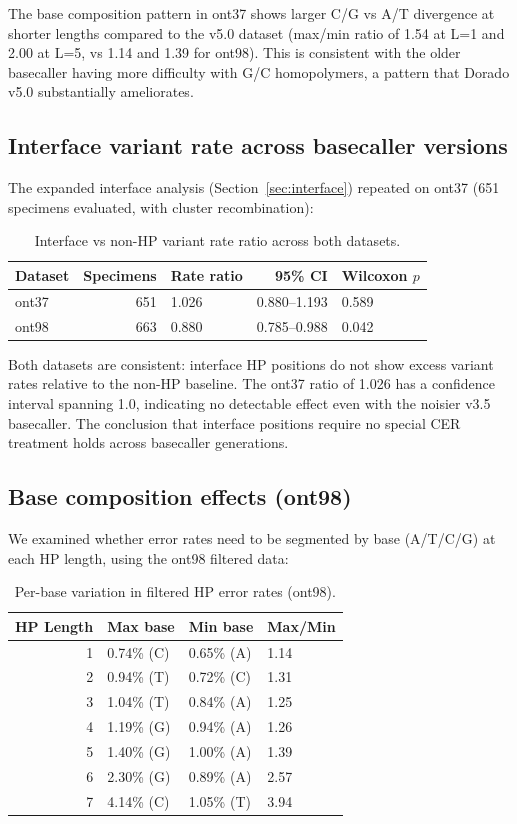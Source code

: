 \documentclass[11pt]{article}
\begin{document}
The base composition pattern in ont37 shows larger C/G vs A/T divergence at
shorter lengths compared to the v5.0 dataset (max/min ratio of 1.54 at L=1
and 2.00 at L=5, vs 1.14 and 1.39 for ont98). This is consistent with the
older basecaller having more difficulty with G/C homopolymers, a pattern that
Dorado v5.0 substantially ameliorates.

\subsection{Interface variant rate across basecaller versions}

The expanded interface analysis (Section~\ref{sec:interface}) repeated on
ont37 (651 specimens evaluated, with cluster recombination):

\begin{table}[h]
\centering
\caption{Interface vs non-HP variant rate ratio across both datasets.}
\label{tab:interface_all}
\begin{tabular}{lrlrl}
\toprule
Dataset & Specimens & Rate ratio & 95\% CI & Wilcoxon $p$ \\
\midrule
ont37 & 651 & 1.026 & 0.880--1.193 & 0.589 \\
ont98 & 663 & 0.880 & 0.785--0.988 & 0.042 \\
\bottomrule
\end{tabular}
\end{table}

Both datasets are consistent: interface HP positions do not show excess
variant rates relative to the non-HP baseline. The ont37 ratio of 1.026 has a
confidence interval spanning 1.0, indicating no detectable effect even with the
noisier v3.5 basecaller. The conclusion that interface positions require no
special CER treatment holds across basecaller generations.

\subsection{Base composition effects (ont98)}

We examined whether error rates need to be segmented by base (A/T/C/G) at each
HP length, using the ont98 filtered data:

\begin{table}[h]
\centering
\caption{Per-base variation in filtered HP error rates (ont98).}
\label{tab:base_effects}
\begin{tabular}{rlll}
\toprule
HP Length & Max base & Min base & Max/Min \\
\midrule
1 & 0.74\% (C) & 0.65\% (A) & 1.14 \\
2 & 0.94\% (T) & 0.72\% (C) & 1.31 \\
3 & 1.04\% (T) & 0.84\% (A) & 1.25 \\
4 & 1.19\% (G) & 0.94\% (A) & 1.26 \\
5 & 1.40\% (G) & 1.00\% (A) & 1.39 \\
6 & 2.30\% (G) & 0.89\% (A) & 2.57 \\
7 & 4.14\% (C) & 1.05\% (T) & 3.94 \\
\bottomrule
\end{tabular}
\end{table}
\end{document}
